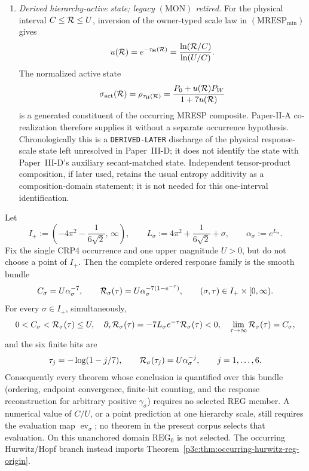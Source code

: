 \documentclass[12pt,a4paper]{article}
\begin{document}
\begin{definition}
\begin{enumerate}[label=(\roman*)]
\item \emph{Derived hierarchy-active state; legacy \((\mathrm{MON})\) retired.}
For the physical interval \(C\le\mathcal R\le U\), inversion of the owner-typed
scale law in \((\mathrm{MRESP}_{\min})\) gives
\[
 u(\mathcal R)=e^{-\tau_{\rm H}(\mathcal R)}
 =\frac{\ln(\mathcal R/C)}{\ln(U/C)}.
\]
The normalized active state
\[
 \sigma_{\rm act}(\mathcal R)
 =\rho_{\tau_{\rm H}(\mathcal R)}
 =\frac{P_0+u(\mathcal R)P_W}{1+7u(\mathcal R)}
\]
is a generated constituent of the occurring MRESP composite.  Paper-II-A
co-realization therefore supplies it without a separate occurrence
hypothesis.  Chronologically this is a \texttt{DERIVED-LATER} discharge of the
physical response-scale state left unresolved in Paper~III-D; it does not
identify the state with Paper~III-D's auxiliary secant-matched state.  Independent tensor-product composition, if later used, retains
the usual entropy additivity as a composition-domain statement; it is not
needed for this one-interval identification.
\end{enumerate}
\end{definition}

\begin{theorem}
\label{p3e:thm:uniform-reg-response-bundle}
Let
\[
 I_+:=\left(-4\pi^2-\frac1{6\sqrt2},\,\infty\right),
 \qquad
 L_\sigma:=4\pi^2+\frac1{6\sqrt2}+\sigma,
 \qquad
 \alpha_\sigma:=e^{L_\sigma}.
\]
Fix the single CRP4 occurrence and one upper magnitude \(U>0\), but do not
choose a point of \(I_+\).  Then the complete
ordered response family is the smooth bundle
\[
 C_\sigma=U\alpha_\sigma^{-7},\qquad
 \mathcal R_\sigma(\tau)
 =U\alpha_\sigma^{-7(1-e^{-\tau})},
 \qquad (\sigma,\tau)\in I_+\times[0,\infty).
\]
For every \(\sigma\in I_+\), simultaneously,
\[
 0<C_\sigma<\mathcal R_\sigma(\tau)\le U,
 \quad
 \partial_\tau\mathcal R_\sigma(\tau)
 =-7L_\sigma e^{-\tau}\mathcal R_\sigma(\tau)<0,
 \quad
 \lim_{\tau\to\infty}\mathcal R_\sigma(\tau)=C_\sigma,
\]
and the six finite hits are
\[
 \tau_j=-\log(1-j/7),\qquad
 \mathcal R_\sigma(\tau_j)=U\alpha_\sigma^{-j},
 \qquad j=1,\ldots,6.
\]
Consequently every theorem whose conclusion is quantified over this bundle
(ordering, endpoint convergence, finite-hit counting, and the response
reconstruction for arbitrary positive \(\gamma_\sigma\)) requires no
selected REG member.  A numerical value of \(C/U\), or a point prediction at
one hierarchy scale, still requires the evaluation map
\(\operatorname{ev}_\sigma\); no theorem in the present corpus selects that
evaluation.  On this unanchored domain \(\mathrm{REG}_0\) is not selected. The occurring Hurwitz/Hopf branch instead imports Theorem~\ref{p3c:thm:occurring-hurwitz-reg-origin}.
\end{theorem}
\end{document}
